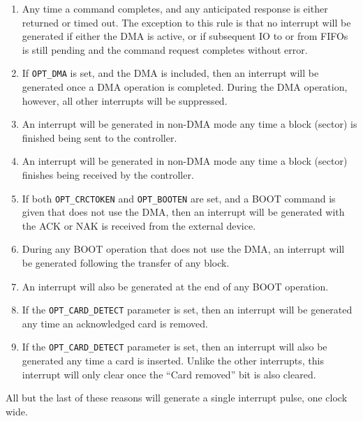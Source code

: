 \documentclass{gqtekspec}
\begin{document}
\begin{enumerate}
\item Any time a command completes, and any anticipated response is either
	returned or timed out.  The exception to this rule is that no interrupt
	will be generated if either the DMA is active, or if subsequent IO to
	or from FIFOs is still pending and the command request completes
	without error.
\item If {\tt OPT\_DMA} is set, and the DMA is included, then an interrupt will
	be generated once a DMA operation is completed.  During the DMA
	operation, however, all other interrupts will be suppressed.
\item An interrupt will be generated in non-DMA mode any time a block (sector)
	is finished being sent to the controller.
\item An interrupt will be generated in non-DMA mode any time a block (sector)
	finishes being received by the controller.
\item If both {\tt OPT\_CRCTOKEN} and {\tt OPT\_BOOTEN} are set, and a
	BOOT command is given that does not use the DMA, then an interrupt
	will be generated with the ACK or NAK is received from the external
	device.
\item During any BOOT operation that does not use the DMA, an interrupt will
	be generated following the transfer of any block.
\item An interrupt will also be generated at the end of any BOOT operation.
\item If the {\tt OPT\_CARD\_DETECT} parameter is set, then an interrupt
	will be generated any time an acknowledged card is removed.
\item If the {\tt OPT\_CARD\_DETECT} parameter is set, then an interrupt will
	also be generated any time a card is inserted.  Unlike the other
	interrupts, this interrupt will only clear once the ``Card removed''
	bit is also cleared.
\end{enumerate}

All but the last of these reasons will generate a single interrupt pulse,
one clock wide.
\end{document}
